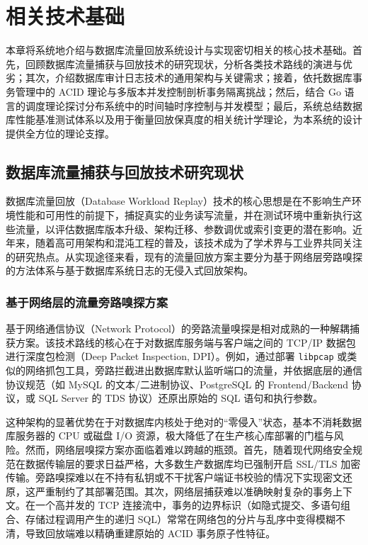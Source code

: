 \newpage
\setcounter{table}{0}
\setcounter{figure}{0}
\section{相关技术基础}

本章将系统地介绍与数据库流量回放系统设计与实现密切相关的核心技术基础。首先，回顾数据库流量捕获与回放技术的研究现状，分析各类技术路线的演进与优劣；其次，介绍数据库审计日志技术的通用架构与关键需求；接着，依托数据库事务管理中的 ACID 理论与多版本并发控制剖析事务隔离挑战；然后，结合 Go 语言的调度理论探讨分布系统中的时间轴时序控制与并发模型；最后，系统总结数据库性能基准测试体系以及用于衡量回放保真度的相关统计学理论，为本系统的设计提供全方位的理论支撑。

\subsection{数据库流量捕获与回放技术研究现状}

数据库流量回放（Database Workload Replay）技术的核心思想是在不影响生产环境性能和可用性的前提下，捕捉真实的业务读写流量，并在测试环境中重新执行这些流量，以评估数据库版本升级、架构迁移、参数调优或索引变更的潜在影响。近年来，随着高可用架构和混沌工程的普及，该技术成为了学术界与工业界共同关注的研究热点。从实现途径来看，现有的流量回放方案主要分为基于网络层旁路嗅探的方法体系与基于数据库系统日志的无侵入式回放架构。

\subsubsection{基于网络层的流量旁路嗅探方案}

基于网络通信协议（Network Protocol）的旁路流量嗅探是相对成熟的一种解耦捕获方案。该技术路线的核心在于对数据库服务端与客户端之间的 TCP/IP 数据包进行深度包检测（Deep Packet Inspection, DPI）\cite{DPI}。例如，通过部署 \texttt{libpcap}\cite{libpcap} 或类似的网络抓包工具，旁路拦截进出数据库默认监听端口的流量，并依据底层的通信协议规范（如 MySQL 的文本/二进制协议\cite{MySQLProtocol}、PostgreSQL 的 Frontend/Backend 协议\cite{protobuf}，或 SQL Server 的 TDS 协议\cite{TDSProtocol}）还原出原始的 SQL 语句和执行参数。

这种架构的显著优势在于对数据库内核处于绝对的“零侵入”状态，基本不消耗数据库服务器的 CPU 或磁盘 I/O 资源，极大降低了在生产核心库部署的门槛与风险。然而，网络层嗅探方案亦面临着难以跨越的瓶颈。首先，随着现代网络安全规范在数据传输层的要求日益严格，大多数生产数据库均已强制开启 SSL/TLS 加密传输\cite{TLS13}。旁路嗅探难以在不持有私钥或不干扰客户端证书校验的情况下实现密文还原，这严重制约了其部署范围。其次，网络层捕获难以准确映射复杂的事务上下文。在一个高并发的 TCP 连接流中，事务的边界标识（如隐式提交、多语句组合、存储过程调用产生的递归 SQL）常常在网络包的分片与乱序中变得模糊不清，导致回放端难以精确重建原始的 ACID 事务原子性特征。

